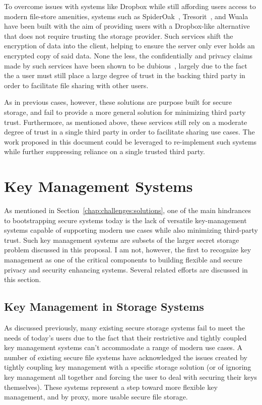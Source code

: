 To overcome issues with systems like Dropbox while still affording
users access to modern file-store amenities, systems such as
SpiderOak~\cite{spideroak}, Tresorit~\cite{tresorit}, and
Wuala~\cite{wuala} have been built with the aim of providing users
with a Dropbox-like alternative that does not require trusting the
storage provider. Such services shift the encryption of data into the
client, helping to ensure the server only ever holds an encrypted copy
of said data. None the less, the confidentially and privacy claims
made by such services have been shown to be dubious~\cite{wilson2014},
largely due to the fact the a user must still place a large degree of
trust in the backing third party in order to facilitate file sharing
with other users.

As in previous cases, however, these solutions are purpose built for
secure storage, and fail to provide a more general solution for
minimizing third party trust. Furthermore, as mentioned above, these
services still rely on a moderate degree of trust in a single third
party in order to facilitate sharing use cases. The work proposed in
this document could be leveraged to re-implement such systems while
further suppressing reliance on a single trusted third party.

\section{Key Management Systems}
\label{chap:related:keymgmt}

As mentioned in Section~\ref{chap:challenges:solutions}, one of the
main hindrances to bootstrapping secure systems today is the lack of
versatile key-management systems capable of supporting modern use
cases while also minimizing third-party trust. Such key management
systems are subsets of the larger secret storage problem discussed in
this proposal. I am not, however, the first to recognize key
management as one of the critical components to building flexible and
secure privacy and security enhancing systems. Several related efforts
are discussed in this section.

\subsection{Key Management in Storage Systems}

As discussed previously, many existing secure storage systems fail to
meet the needs of today's users due to the fact that their restrictive
and tightly coupled key management systems can't accommodate a range
of modern use cases. A number of existing secure file systems have
acknowledged the issues created by tightly coupling key management
with a specific storage solution (or of ignoring key management all
together and forcing the user to deal with securing their keys
themselves). These systems represent a step toward more flexible key
management, and by proxy, more usable secure file storage.

